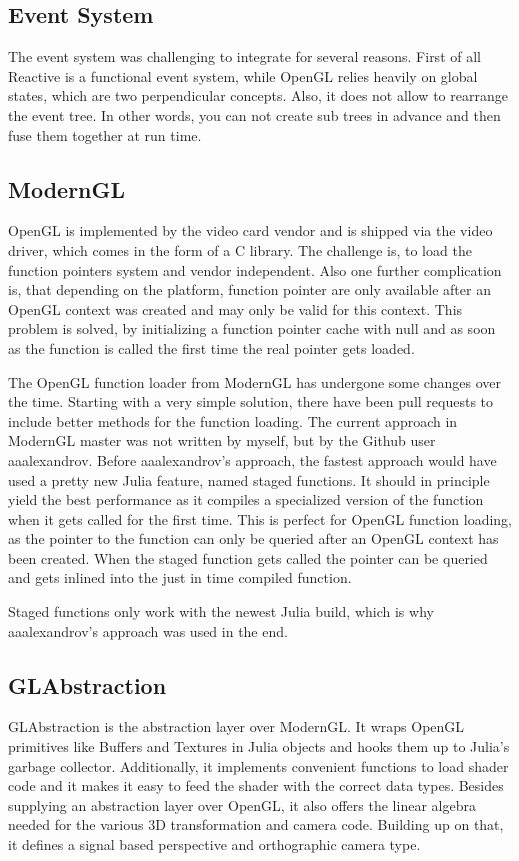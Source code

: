 \subsection{Event System}

The event system was challenging to integrate for several reasons.
First of all Reactive is a functional event system, while \ac{OpenGL} relies heavily on global states, which are two perpendicular concepts.
Also, it does not allow to rearrange the event tree. 
In other words, you can not create sub trees in advance and then fuse them together at run time.

\subsection{ModernGL}
\ac{OpenGL} is implemented by the video card vendor and is shipped via the video driver, which comes in the form of a C library.
The challenge is, to load the function pointers system and vendor independent. 
Also one further complication is, that depending on the platform, 
function pointer are only available after an \ac{OpenGL} context was created and may only be valid for this context. \cite{wgl}
This problem is solved, by initializing a function pointer cache with null and as soon as the function is called the first time the real pointer gets loaded.

The OpenGL function loader from ModernGL has undergone some changes over the time.
Starting with a very simple solution, there have been pull requests to include better methods for the function loading.
The current approach in ModernGL master was not written by myself, but by the Github user aaalexandrov.
Before aaalexandrov’s approach, the fastest approach would have used a pretty new Julia feature, named staged functions.
It should in principle yield the best performance as it compiles a specialized version of the function when it gets called for the first time. This is perfect for OpenGL function loading, as the pointer to the function can only be queried after an OpenGL context has been created. When the staged function gets called the pointer can be queried and gets inlined into the just in time compiled function.

Staged functions only work with the newest Julia build, which is why aaalexandrov’s approach was used in the end.


\subsection{GLAbstraction}
GLAbstraction is the abstraction layer over ModernGL.
It wraps \ac{OpenGL} primitives like Buffers and Textures in Julia objects and hooks them up to Julia's garbage collector.
Additionally, it implements convenient functions to load shader code and it makes it easy to feed the shader with the correct data types.
Besides supplying an abstraction layer over \ac{OpenGL}, it also offers the linear algebra needed for the various 3D transformation and camera code.
Building up on that, it defines a signal based perspective and orthographic camera type.

